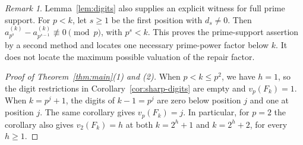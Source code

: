 \documentclass[11pt]{article}
\theoremstyle{remark}
\newtheorem{remark}[theorem]{Remark}
\begin{document}
\begin{remark}
Lemma~\ref{lem:digits} also supplies an explicit witness for full prime
support. For $p<k$, let $s\geq1$ be the first position with $d_s\ne0$.
Then $a_{p^s}^{(k)}-a_{p^{s-1}}^{(k)}\not\equiv0\pmod p$, with $p^s<k$.
This proves the prime-support assertion by a second method and locates
one necessary prime-power factor below $k$. It does not locate the
maximum possible valuation of the repair factor.
\end{remark}

\begin{proof}[Proof of Theorem~\ref{thm:main}(1) and (2)]
When $p<k\leq p^2$, we have $h=1$, so the digit restrictions in
Corollary~\ref{cor:sharp-digits} are empty and $v_p(F_k)=1$.
When $k=p^j+1$, the digits of $k-1=p^j$ are zero below position $j$
and one at position $j$. The same corollary gives $v_p(F_k)=j$.
In particular, for $p=2$ the corollary also gives
$v_2(F_k)=h$ at both $k=2^h+1$ and $k=2^h+2$, for every $h\geq1$.
\end{proof}
\end{document}

